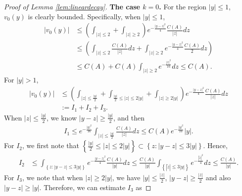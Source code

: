 \documentclass[12pt]{amsart}
\numberwithin{equation}{section}              %
\theoremstyle{remark}
\begin{document}
\begin{proof}[Proof of Lemma \ref{lem:lineardecay}]
\textbf{The case $k=0$.}        
		For the region $|y| \leq 1$, $v_0(y)$ is clearly bounded. Specifically, when $|y|\leq 1$,
		\begin{equation}\label{eq:boundednessinside}
			\begin{aligned}
				| v_0(y) |&\leq  \left(\int_{|z|\leq 2} + \int_{|z|\geq 2}  \right) e^{-\frac{| y-  z|^2}{4  }}\frac{C(A)}{|z|}dz\\
				& \leq \left(\int_{|z|\leq 2} \frac{C(A)}{|z|}dz + \int_{|z|\geq 2}  e^{-\frac{| y-  z|^2}{4  }}\frac{C(A)}{2}dz\right)\\
				&\le C(A) +C(A)\int_{|z|\geq 2}  e^{-\frac{|  z|^2}{16 }}dz\le C(A).
			\end{aligned}           
		\end{equation}
		For $|y|>1$,
        \begin{equation*}
			\begin{aligned}
				| v_0(y) |&\leq  \left(\int_{|z|\leq \frac{|y|}{2}} + \int_{ \frac{|y|}{2}\leq |z| \leq 2|y|} + \int_{|z|\geq 2|y|}  \right) e^{-\frac{| y-  z|^2}{4  }}\frac{C(A)}{|z|}dz\\
                &:=I_1+I_2+I_3.
			\end{aligned}           
		\end{equation*}
        When $|z|\leq \frac{|y|}{2}$, we know $|y-z|\geq \frac{|y|}{2}$, and then
        \begin{equation*}
			\begin{aligned}
            I_1\leq e^{-\frac{|y|^2}{16}} \int_{|z|\leq \frac{|y|}{2}} \frac{C(A)}{|z|}dz \leq C(A)e^{-\frac{|y|^2}{16}} |y|.
            \end{aligned}           
		\end{equation*}
        For $I_2$, 
        we first note that $\left\{\frac{|y|}{2}\leq |z| \leq 2|y|\right\}\subset \left\{z: |y-z| \leq 3|y|\right\}$. Hence,
        \begin{equation*}
			\begin{aligned}
            I_2 &\leq \int_{\left\{z: |y-z| \leq 3|y|\right\}} e^{-\frac{| y-  z|^2}{4  }}\frac{C(A)}{|y|} dz
             \leq \frac{C(A)}{|y|} \int_{\left\{ |\tilde{z}| \leq 3|y|\right\}} e^{-\frac{| \tilde{z}|^2}{4  }} dz \leq \frac{C(A)}{|y|}. 
            \end{aligned}           
		\end{equation*}
        For $I_3$, we note that when $|z|\geq 2|y|$, we have $|y|\leq \frac{|z|}{2}$, $|y-z|\geq \frac{|z|}{2}$ and also $|y-z|\geq |y|$. Therefore, we 
      can  estimate  $I_3$ as

\end{proof}
\end{document}
